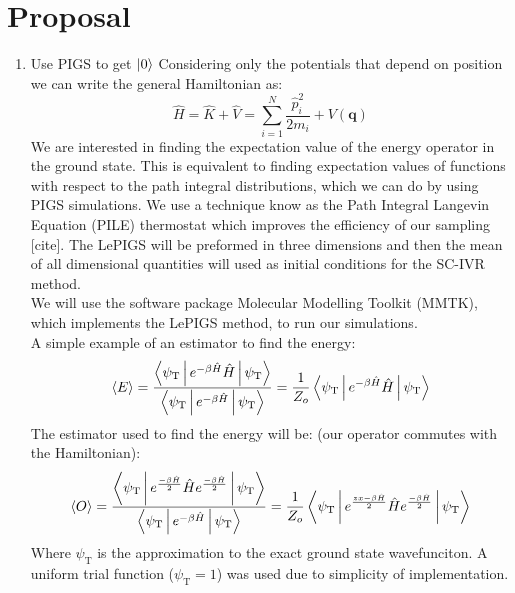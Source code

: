 \documentclass[12pt,letterpaper,oneside,final,titlepage]{article}               %
\numberwithin{equation}{section} %
\newcommand{\psiT}{\psi_{\textrm{T}}}
\renewcommand{\vec}[1]{\mathbf{#1}}
\begin{document}
\section{Proposal}
\begin{enumerate}
	\item Use PIGS to get $\ket{0}$
	Considering only the potentials that depend on position we can write the general Hamiltonian as:
	\begin{equation}
		\hat{H} = \hat{K} + \hat{V} = \sum_{i=1}^{N}\frac{\hat{p}_{i}^2}{2m_{i}} + V(\vec{q})
	\end{equation}
	We are interested in finding the expectation value of the energy operator in the ground state. 
	This is equivalent to finding expectation values of functions with respect to the path integral distributions, which we can do by using PIGS simulations.
	We use a technique know as the Path Integral Langevin Equation (PILE) thermostat which improves the efficiency of our sampling [cite].
	The LePIGS will be preformed in three dimensions and then the mean of all dimensional quantities will used as initial conditions for the SC-IVR method. \\
	We will use the software package Molecular Modelling Toolkit (MMTK), which implements the LePIGS method, to run our simulations.\\
	A simple example of an estimator to find the energy:
	\begin{equation}
		\Braket{E} 
		= \frac{\Braket{\psiT|e^{-\beta\hat{H}}\hat{H}|\psiT}}{\Braket{\psiT|e^{-\beta\hat{H}}|\psiT}} 
		= \frac{1}{Z_{o}} \Braket{\psiT|e^{-\beta\hat{H}} \hat{H}|\psiT}
	\end{equation}
	The estimator used to find the energy will be: (our operator commutes with the Hamiltonian):
	\begin{equation}
		\Braket{O} 
		= \frac{\Braket{\psiT|e^{\frac{-\beta\hat{H}}{2}} \hat{H} e^{\frac{-\beta\hat{H}}{2}}|\psiT}}{\Braket{\psiT|e^{-\beta\hat{H}}|\psiT}} 
		= \frac{1}{Z_{o}} \Braket{\psiT|e^{\frac{zx-\beta\hat{H}}{2}} \hat{H} e^{\frac{-\beta\hat{H}}{2}}|\psiT}
	\end{equation}
	Where $\psiT$ is the approximation to the exact ground state wavefunciton. 
	A uniform trial function ($\psiT = 1$) was used due to simplicity of implementation.


\end{enumerate}
\end{document}
